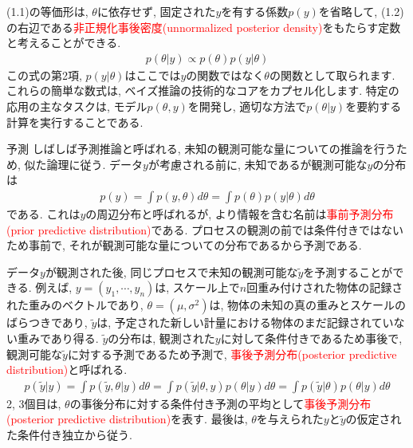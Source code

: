 \documentclass[10pt,dvipdfmx,a4]{beamer}
\newcommand{\eq}[1]{\begin{align}#1\end{align}}
\newcommand{\tcr}[1]{\textcolor{red}{#1}}
\begin{document}

\begin{frame}
(1.1)の等価形は, $\theta$に依存せず, 固定された$y$を有する係数$p(y)$を省略して, (1.2)の右辺である\tcr{非正規化事後密度(unnormalized posterior density)}をもたらす定数と考えることができる.
\eq{p(\theta|y)\propto p(\theta)p(y|\theta)}
この式の第2項, $p(y|\theta)$はここでは$y$の関数ではなく$\theta$の関数として取られます.
これらの簡単な数式は, ベイズ推論の技術的なコアをカプセル化します.
特定の応用の主なタスクは, モデル$p(\theta,y)$を開発し, 適切な方法で$p(\theta|y)$を要約する計算を実行することである.
\end{frame}


\begin{frame}{予測}
しばしば予測推論と呼ばれる, 未知の観測可能な量についての推論を行うため, 似た論理に従う.
データ$y$が考慮される前に, 未知であるが観測可能な$y$の分布は
\eq{p(y)=\int p(y,\theta)d\theta=\int p(\theta)p(y|\theta)d\theta}
である.
これは$y$の周辺分布と呼ばれるが, より情報を含む名前は\tcr{事前予測分布(prior predictive distribution)}である.
プロセスの観測の前では条件付きではないため事前で, それが観測可能な量についての分布であるから予測である.
\end{frame}


\begin{frame}
データ$y$が観測された後, 同じプロセスで未知の観測可能な$\tilde{y}$を予測することができる.
例えば, $y=(y_1,\cdots, y_n)$は, スケール上で$n$回重み付けされた物体の記録された重みのベクトルであり, $\theta=(\mu,\sigma^2)$は, 物体の未知の真の重みとスケールのばらつきであり, $\tilde{y}$は, 予定された新しい計量における物体のまだ記録されていない重みであり得る.
$\tilde{y}$の分布は, 観測された$y$に対して条件付きであるため事後で, 観測可能な$\tilde{y}$に対する予測であるため予測で, \tcr{事後予測分布(posterior predictive distribution)}と呼ばれる.
\eq{p(\tilde{y}|y)=\int p(\tilde{y},\theta|y)d\theta=\int p(\tilde{y}|\theta,y)p(\theta|y)d\theta=\int p(\tilde{y}|\theta)p(\theta|y)d\theta}
2, 3個目は, $\theta$の事後分布に対する条件付き予測の平均として\tcr{事後予測分布(posterior predictive distribution)}を表す.
最後は, $\theta$を与えられた$y$と$\tilde{y}$の仮定された条件付き独立から従う.
\end{frame}

\end{document}
